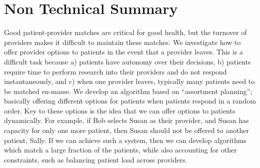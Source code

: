 \section*{Non Technical Summary}
Good patient-provider matches are critical for good health, but the turnover of providers makes it difficult to maintain these matches. 
We investigate how to offer provider options to patients in the event that a provider leaves. 
This is a difficult task because a) patients have autonomy over their decisions, b) patients require time to perform research into their providers and do not respond instantaneously, and c) when one provider leaves, typically many patients need to be matched en-masse. 
We develop an algorithm based on ``assortment planning''; basically offering different options for patients when patients respond in a random order. 
Key to these options is the idea that we can offer options to patients dynamically. 
For example, if Bob selects Susan as their provider, and Susan has capacity for only one more patient, then Susan should not be offered to another patient, Sally.
If we can achieve such a system, then we can develop algorithms which match a large fraction of the patients, while also accounting for other constraints, such as balancing patient load across providers. 